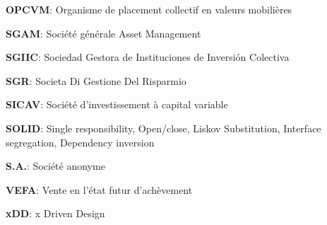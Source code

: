 \par \textbf{OPCVM}: Organisme de placement collectif en valeurs mobilières \\
\par \textbf{SGAM}: Société générale Asset Management \\
\par \textbf{SGIIC}: Sociedad Gestora de Instituciones de Inversión Colectiva \\
\par \textbf{SGR}: Societa Di Gestione Del Risparmio \\
\par \textbf{SICAV}: Société d'investissement à capital variable \\
\par \textbf{SOLID}: Single responsibility, Open/close, Liskov Substitution, Interface segregation, Dependency inversion \\
\par \textbf{S.A.}: Société anonyme \\
\par \textbf{VEFA}: Vente en l'état futur d'achèvement \\
\par \textbf{xDD}: x Driven Design \\
\clearpage
